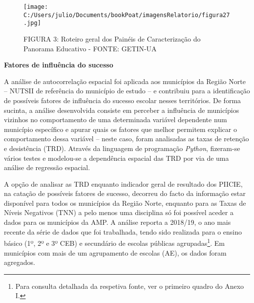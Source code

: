 \documentclass[
]{book}
\begin{document}
\begin{figure}
\centering
\texttt{[image: C:/Users/julio/Documents/bookPoat/imagensRelatorio/figura27.jpg]}
\caption{FIGURA 3: Roteiro geral dos Painéis de Caracterização do Panorama Educativo - FONTE: GETIN-UA}
\end{figure}

\textbf{Fatores de influência do sucesso}

A análise de autocorrelação espacial foi aplicada aos municípios da Região Norte -- NUTSII de referência do município de estudo -- e contribuiu para a identificação de possíveis fatores de influência do sucesso escolar nesses territórios. De forma sucinta, a análise desenvolvida consiste em perceber a influência de municípios vizinhos no comportamento de uma determinada variável dependente num município específico e apurar quais os fatores que melhor permitem explicar o comportamento dessa variável -- neste caso, foram analisadas as taxas de retenção e desistência (TRD). Através da linguagem de programação \emph{Python}, fizeram-se vários testes e modelou-se a dependência espacial das TRD por via de uma análise de regressão espacial.

A opção de analisar as TRD enquanto indicador geral de resultado dos PIICIE, na catação de possíveis fatores de sucesso, decorreu do facto da informação estar disponível para todos os municípios da Região Norte, enquanto para as Taxas de Níveis Negativos (TNN) a pelo menos uma disciplina só foi possível aceder a dados para os municípios da AMP. A análise reporta a 2018/19, o ano mais recente da série de dados que foi trabalhada, tendo sido realizada para o ensino básico (1º, 2º e 3º CEB) e secundário de escolas públicas agrupadas\footnote{Para consulta detalhada da respetiva fonte, ver o primeiro quadro do Anexo I.}. Em municípios com mais de um agrupamento de escolas (AE), os dados foram agregados.
\end{document}
